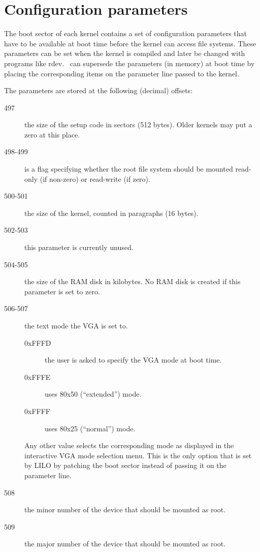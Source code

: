 \section{Configuration parameters}

The boot sector of each kernel contains a set of configuration parameters
that have to be available at boot time before the kernel can access
file systems. These parameters can be set when the kernel is compiled and
later be changed with programs like {\sf rdev}. \LILO\ can supersede
the parameters (in memory) at boot time by placing the corresponding
items on the parameter line passed to the kernel.

The parameters are stored at the following (decimal) offsets:

\begin{description}
  \item[497] the size of the setup code in sectors (512 bytes). Older kernels
    may put a zero at this place.
  \item[498-499] is a flag specifying whether the root file system should be
    mounted read-only (if non-zero) or read-write (if zero).
  \item[500-501] the size of the kernel, counted in paragraphs (16 bytes).
  \item[502-503] this parameter is currently unused.
  \item[504-505] the size of the RAM disk in kilobytes. No RAM disk is
    created if this parameter is set to zero.
  \item[506-507] the text mode the VGA is set to.
    \begin{description}
      \item[0xFFFD] the user is asked to specify the VGA mode at boot time.
      \item[0xFFFE] uses 80x50 (``extended'') mode.
      \item[0xFFFF] uses 80x25 (``normal'') mode.
    \end{description}
    Any other value selects the corresponding mode as displayed in the
    interactive VGA mode selection menu. This is the only option that is set
    by LILO by patching the boot sector instead of passing it on the parameter
    line.
  \item[508] the minor number of the device that should be mounted as root.
  \item[509] the major number of the device that should be mounted as root.
\end{description}


